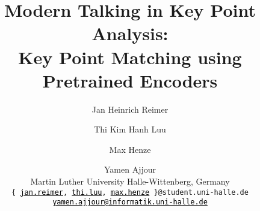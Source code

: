 \documentclass[11pt]{article}
\title{%
  Modern Talking in Key Point Analysis: \\
  Key Point Matching using Pretrained Encoders%
}
\author{%
  Jan Heinrich Reimer \and Thi Kim Hanh Luu \and Max Henze \and Yamen Ajjour \\
  Martin Luther University Halle-Wittenberg, Germany \\ 
  \texttt{\{%
  \href{mailto:jan.reimer@student.uni-halle.de}{\textcolor{black}{jan.reimer}},%
  \href{mailto:thi.luu@student.uni-halle.de}{\textcolor{black}{thi.luu}},%
  \href{mailto:max.henze@student.uni-halle.de}{\textcolor{black}{max.henze}}%
  \}@student.uni-halle.de} \\ 
  \texttt{\href{mailto:yamen.ajjour@informatik.uni-halle.de}{\textcolor{black}{yamen.ajjour@informatik.uni-halle.de}}}%
}
\begin{document}
\maketitle

\begin{abstract}
  
\end{abstract}












\appendix


\end{document}
